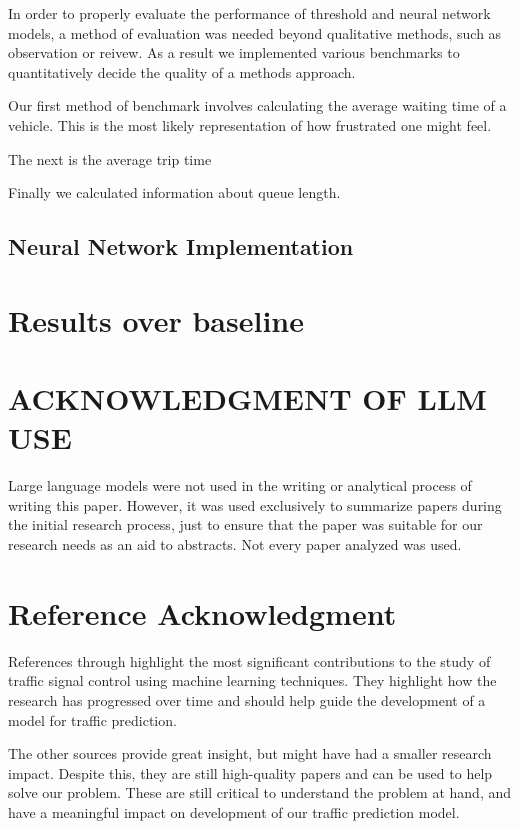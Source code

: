 \documentclass[conference]{IEEEtran}
\begin{document}
In order to properly evaluate the performance of threshold and neural network models, a method of evaluation was needed beyond qualitative methods, such as observation or reivew. As a result we implemented various benchmarks to quantitatively decide the quality of a methods approach. 

Our first method of benchmark involves calculating the average waiting time of a vehicle. This is the most likely representation of how frustrated one might feel.

The next is the average trip time

Finally we calculated information about queue length. 

\subsection{Neural Network Implementation}

\section{Results over baseline}

\section{ACKNOWLEDGMENT OF LLM USE}

Large language models were not used in the writing or analytical process of writing this paper. However, it was used exclusively to summarize papers during the initial research process, just to ensure that the paper was suitable for our research needs as an aid to abstracts. Not every paper analyzed was used. 

\section*{Reference Acknowledgment}
References \cite{1} through \cite{15} highlight the most significant contributions to the study of traffic signal control using machine learning techniques. They highlight how the research has progressed over time and should help guide the development of a model for traffic prediction. 

The other sources provide great insight, but might have had a smaller research impact. Despite this, they are still high-quality papers and can be used to help solve our problem. These are still critical to understand the problem at hand, and have a meaningful impact on development of our traffic prediction model. 
\end{document}
